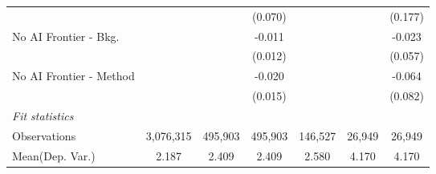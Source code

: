 \begin{tabular}{lcccccc}
                           &           &         & (0.070)       &               &                & (0.177)\\   
   No AI Frontier - Bkg.   &           &         & -0.011        &               &                & -0.023\\   
                           &           &         & (0.012)       &               &                & (0.057)\\   
   No AI Frontier - Method &           &         & -0.020        &               &                & -0.064\\   
                           &           &         & (0.015)       &               &                & (0.082)\\   
   \midrule
   \emph{Fit statistics}\\
   Observations            & 3,076,315 & 495,903 & 495,903       & 146,527       & 26,949         & 26,949\\  
Mean(Dep. Var.) & 2.187 & 2.409 & 2.409 & 2.580 & 4.170 & 4.170 \\
   

\end{tabular}
